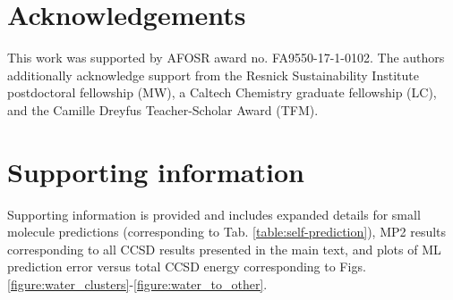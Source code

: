 \documentclass[%
 aps,
 prb,
 twocolumn,
%
 reprint,%
%
citeautoscript,
%
showkeys
]{revtex4-1}
\begin{document}
%
%
%
%
%
%
%
%
%
%
%
%
%
%
%
%
%
%
%
%
%
%
%
%
%
%
%
%
%
%
%
%
%
%
%
%
%
%
%
%
%
%
%
%
%

%


\section*{Acknowledgements}
This work was supported by AFOSR award no. FA9550-17-1-0102.
The authors additionally acknowledge support from  the Resnick Sustainability Institute postdoctoral fellowship (MW), a Caltech Chemistry graduate fellowship (LC), and the Camille Dreyfus Teacher-Scholar Award (TFM).

\section*{Supporting information}
Supporting information is provided and includes 
expanded details for small molecule predictions (corresponding to Tab. \ref{table:self-prediction}), 
MP2 results corresponding to all CCSD results presented in the main text, 
and plots of ML prediction error versus total CCSD energy corresponding to Figs. \ref{figure:water_clusters}-\ref{figure:water_to_other}.

%
%
%
%
%
%
%
%
%
%
%
%
%
%
%
%
%
%
%
%



\end{document}
